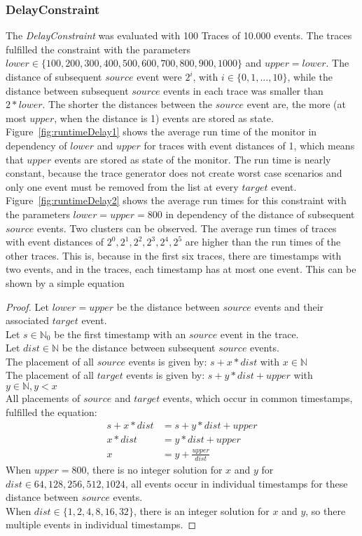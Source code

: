 \subsubsection{DelayConstraint}
	The \textit{DelayConstraint} was evaluated with 100 Traces of 10.000 events. The traces fulfilled the constraint with the parameters $lower\in\{100, 200, 300, 400, 500, 600, 700, 800, 900, 1000\}$ and $upper=lower$.  The distance of subsequent $source$ event were $2^i$, with $i\in \{0, 1, ..., 10\}$, while the distance between subsequent $source$ events in each trace was smaller than $2*lower$. The shorter the distances between the $source$ event are, the more (at most $upper$, when the distance is 1) events are stored as state.\\
	Figure~\ref{fig:runtimeDelay1} shows the average run time of the monitor in dependency of $lower$ and $upper$ for traces with event distances of 1, which means that $upper$ events are stored as state of the monitor. The run time is nearly constant, because the trace generator does not create worst case scenarios and only one event must be removed from the list at every $target$ event.\\
	Figure~\ref{fig:runtimeDelay2} shows the average run times for this constraint with the parameters $lower=upper=800$ in dependency of the distance of subsequent $source$ events. Two clusters can be observed. The average run times of traces with event distances of $2^0, 2^1,2^2,2^3,2^4,2^5$ are higher than the run times of the other traces. This is, because in the first six traces, there are timestamps with two events, and in the traces, each timestamp has at most one event. This can be shown by a simple equation
	\begin{proof}
		Let $lower=upper$ be the distance between $source$ events and their associated $target$ event.\\
		Let $s\in\mathbb{N}_0$ be the first timestamp with an $source$ event in the trace.\\
		Let $dist\in\mathbb{N}$ be the distance between subsequent $source$ events.\\
		The placement of all $source$ events is given by: $s+x*dist$ with $x\in\mathbb N$\\
		The placement of all $target$ events is given by: $s+y*dist + upper$ with $y\in\mathbb N, y<x$\\
		All placements of $source$ and $target$ events, which occur in common timestamps, fulfilled the equation:\\
		\begin{align}
			s+x*dist&=s+y*dist+upper\\
			x*dist&=y*dist+upper\\
			x&= y + \frac{upper}{dist}
		\end{align}
		When $upper=800$, there is no integer solution for $x$ and $y$ for $dist\in{64,128,256,512,1024}$, all events occur in individual timestamps for these distance between $source$ events.\\
		When $dist\in\{1,2,4,8,16,32\}$, there is an integer solution for $x$ and $y$, so there multiple events in individual timestamps.
	\end{proof}
